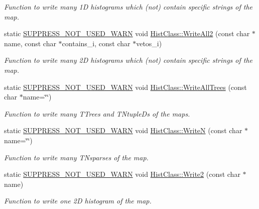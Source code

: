 \begin{DoxyCompactItemize}
\begin{DoxyCompactList}\small\item\em Function to write many 1\-D histograms which (not) contain specific strings of the map. \end{DoxyCompactList}\item 
static \hyperlink{HistClass_8hh_a85edd6ac47f5ea2970c76af20855738c}{S\-U\-P\-P\-R\-E\-S\-S\-\_\-\-N\-O\-T\-\_\-\-U\-S\-E\-D\-\_\-\-W\-A\-R\-N} void \hyperlink{namespaceHistClass_ae1f262197503e7a93e7f007aa5205144}{Hist\-Class\-::\-Write\-All2} (const char $\ast$name, const char $\ast$contains\-\_\-i, const char $\ast$vetos\-\_\-i)
\begin{DoxyCompactList}\small\item\em Function to write many 2\-D histograms which (not) contain specific strings of the map. \end{DoxyCompactList}\item 
static \hyperlink{HistClass_8hh_a85edd6ac47f5ea2970c76af20855738c}{S\-U\-P\-P\-R\-E\-S\-S\-\_\-\-N\-O\-T\-\_\-\-U\-S\-E\-D\-\_\-\-W\-A\-R\-N} void \hyperlink{namespaceHistClass_a3f0a61ef88b8603ea99d534c15f9c657}{Hist\-Class\-::\-Write\-All\-Trees} (const char $\ast$name=\char`\"{}\char`\"{})
\begin{DoxyCompactList}\small\item\em Function to write many T\-Trees and T\-Ntuple\-Ds of the maps. \end{DoxyCompactList}\item 
static \hyperlink{HistClass_8hh_a85edd6ac47f5ea2970c76af20855738c}{S\-U\-P\-P\-R\-E\-S\-S\-\_\-\-N\-O\-T\-\_\-\-U\-S\-E\-D\-\_\-\-W\-A\-R\-N} void \hyperlink{namespaceHistClass_a6fc4f287969f4f5fc0e92074d1e7099c}{Hist\-Class\-::\-Write\-N} (const char $\ast$name=\char`\"{}\char`\"{})
\begin{DoxyCompactList}\small\item\em Function to write many T\-Nsparses of the map. \end{DoxyCompactList}\item 
static \hyperlink{HistClass_8hh_a85edd6ac47f5ea2970c76af20855738c}{S\-U\-P\-P\-R\-E\-S\-S\-\_\-\-N\-O\-T\-\_\-\-U\-S\-E\-D\-\_\-\-W\-A\-R\-N} void \hyperlink{namespaceHistClass_a3acb67cee663e4c97d5ce0645139715b}{Hist\-Class\-::\-Write2} (const char $\ast$name)
\begin{DoxyCompactList}\small\item\em Function to write one 2\-D histogram of the map. \end{DoxyCompactList}\item 

\end{DoxyCompactItemize}
